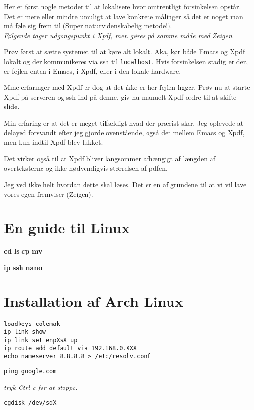 \documentclass[10pt,a4paper,danish]{article}
\begin{document}
Her er først nogle metoder til at lokalisere hvor omtrentligt forsinkelsen
opstår.
Det er mere eller mindre umuligt at lave konkrete målinger så det er noget man
må føle sig frem til (Super naturvidenskabelig metode!).\\
\textit{Følgende tager udgangspunkt i Xpdf, men gøres på samme måde med Zeigen}

Prøv først at sætte systemet til at køre alt lokalt. Aka, kør både Emacs og Xpdf
lokalt og der kommunikeres via ssh til \texttt{localhost}. Hvis forsinkelsen
stadig er der, er fejlen enten i Emacs, i Xpdf, eller i den lokale
hardware.

Mine erfaringer med Xpdf er dog at det ikke er her fejlen ligger.
Prøv nu at starte Xpdf på serveren og ssh ind på denne, giv nu manuelt Xpdf
ordre til at skifte slide.

Min erfaring er at det er meget tilfældigt hvad der præcist sker. Jeg oplevede
at delayed forsvandt efter jeg gjorde ovenstående, også det mellem Emacs og
Xpdf, men kun indtil Xpdf blev lukket.

Det virker også til at Xpdf bliver langsommer afhængigt af længden af
overteksterne og ikke nødvendigvis størrelsen af pdfen.

Jeg ved ikke helt hvordan dette skal løses.
Det er en af grundene til at vi vil lave vores egen fremviser (Zeigen).

\appendix
\section{En guide til Linux}
\textbf{cd}
\textbf{ls}
\textbf{cp}
\textbf{mv}

\textbf{ip}
\textbf{ssh}
\textbf{nano}

\section{Installation af Arch Linux}
\begin{verbatim}
loadkeys colemak
ip link show
ip link set enpXsX up
ip route add default via 192.168.0.XXX
echo nameserver 8.8.8.8 > /etc/resolv.conf
\end{verbatim}

\begin{verbatim}
ping google.com
\end{verbatim}
\textit{tryk Ctrl-c for at stoppe.}

\begin{verbatim}
cgdisk /dev/sdX
\end{verbatim}
\end{document}

